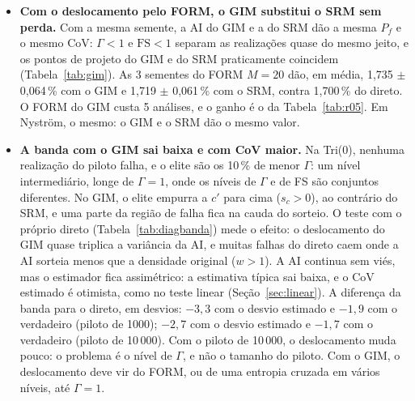 \documentclass[11pt,a4paper]{article}
\begin{document}
\begin{itemize}
  \item \textbf{Com o deslocamento pelo FORM, o GIM substitui o SRM sem perda.} Com a mesma semente, a AI do GIM e a do
    SRM dão a mesma $P_f$ e o mesmo CoV: $\Gamma < 1$ e $\mathrm{FS} < 1$ separam as realizações quase do mesmo jeito, e os
    pontos de projeto do GIM e do SRM praticamente coincidem (Tabela~\ref{tab:gim}). As 3 sementes do FORM $M = 20$ dão, em média, 1{,}735 $\pm$ 0{,}064\,\% com o GIM e 1{,}719 $\pm$ 0{,}061\,\% com o SRM, contra 1{,}700\,\% do direto. O FORM do
    GIM custa 5 análises, e o ganho é o da Tabela~\ref{tab:r05}. Em Nyström, o mesmo: o GIM e o SRM dão o mesmo valor.
  \item \textbf{A banda com o GIM sai baixa e com CoV maior.} Na Tri(0), nenhuma realização do piloto falha, e o elite são
    os 10\,\% de menor $\Gamma$: um nível intermediário, longe de $\Gamma = 1$, onde os níveis de $\Gamma$ e de FS são
    conjuntos diferentes. No GIM, o elite empurra a $c'$ para cima ($s_c > 0$), ao contrário do SRM, e uma parte da região
    de falha fica na cauda do sorteio. O teste com o próprio direto (Tabela~\ref{tab:diagbanda}) mede o efeito: o
    deslocamento do GIM quase triplica a variância da AI, e muitas falhas do direto caem onde a AI sorteia menos que a
    densidade original ($w > 1$). A AI continua sem viés, mas o estimador fica assimétrico: a estimativa típica sai baixa,
    e o CoV estimado é otimista, como no teste linear (Seção~\ref{sec:linear}). A diferença da banda para o direto, em
    desvios: $-3{,}3$ com o desvio estimado e $-1{,}9$ com o verdadeiro (piloto de 1000); $-2{,}7$ com o desvio estimado e $-1{,}7$ com o verdadeiro (piloto de 10\,000). Com o piloto de 10\,000, o deslocamento
    muda pouco: o problema é o nível de $\Gamma$, e não o tamanho do piloto. Com o GIM, o deslocamento deve vir do FORM,
    ou de uma entropia cruzada em vários níveis, até $\Gamma = 1$.
\end{itemize}
\begin{table}[H]\centering\small
{}
\caption{A banda avaliada com o próprio direto de $r = -0{,}5$ (sem elementos finitos): o deslocamento $\bm\mu = (s_c\,\bm
e_B,\ s_\varphi\,\bm e_B)$ de cada banda, o CoV verdadeiro de uma AI de 1000, as falhas esperadas nela e as falhas do
direto onde a AI sorteia menos que a densidade original. A falha é a do direto ($\mathrm{FS} < 1$).}\label{tab:diagbanda}
\end{table}
\end{document}
